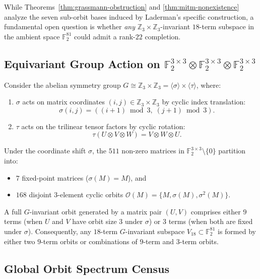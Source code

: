 \documentclass[11pt,reqno]{amsart}
\theoremstyle{plain}
\theoremstyle{definition}
\begin{document}
While Theorems~\ref{thm:grassmann-obstruction} and \ref{thm:mitm-nonexistence} analyze the seven sub-orbit bases induced by Laderman's specific construction, a fundamental open question is whether \emph{any} $\mathbb{Z}_3 \times \mathbb{Z}_3$-invariant $18$-term subspace in the ambient space $\mathbb{F}_2^{81}$ could admit a rank-$22$ completion.

\subsection{Equivariant Group Action on $\mathbb{F}_2^{3 \times 3} \otimes \mathbb{F}_2^{3 \times 3} \otimes \mathbb{F}_2^{3 \times 3}$}

Consider the abelian symmetry group $G \cong \mathbb{Z}_3 \times \mathbb{Z}_3 = \langle \sigma \rangle \times \langle \tau \rangle$, where:
\begin{enumerate}
    \item $\sigma$ acts on matrix coordinates $(i, j) \in \mathbb{Z}_3 \times \mathbb{Z}_3$ by cyclic index translation:
    \begin{equation}
    \sigma(i, j) = ((i + 1) \bmod 3, \; (j + 1) \bmod 3).
    \end{equation}
    \item $\tau$ acts on the trilinear tensor factors by cyclic rotation:
    \begin{equation}
    \tau(U \otimes V \otimes W) = V \otimes W \otimes U.
    \end{equation}
\end{enumerate}

Under the coordinate shift $\sigma$, the $511$ non-zero matrices in $\mathbb{F}_2^{3 \times 3} \setminus \{0\}$ partition into:
\begin{itemize}
    \item $7$ fixed-point matrices ($\sigma(M) = M$), and
    \item $168$ disjoint $3$-element cyclic orbits $\mathcal{O}(M) = \{M, \sigma(M), \sigma^2(M)\}$.
\end{itemize}

A full $G$-invariant orbit generated by a matrix pair $(U, V)$ comprises either $9$ terms (when $U$ and $V$ have orbit size $3$ under $\sigma$) or $3$ terms (when both are fixed under $\sigma$). Consequently, any $18$-term $G$-invariant subspace $V_{18} \subset \mathbb{F}_2^{81}$ is formed by either two $9$-term orbits or combinations of $9$-term and $3$-term orbits.

\subsection{Global Orbit Spectrum Census}
\end{document}
